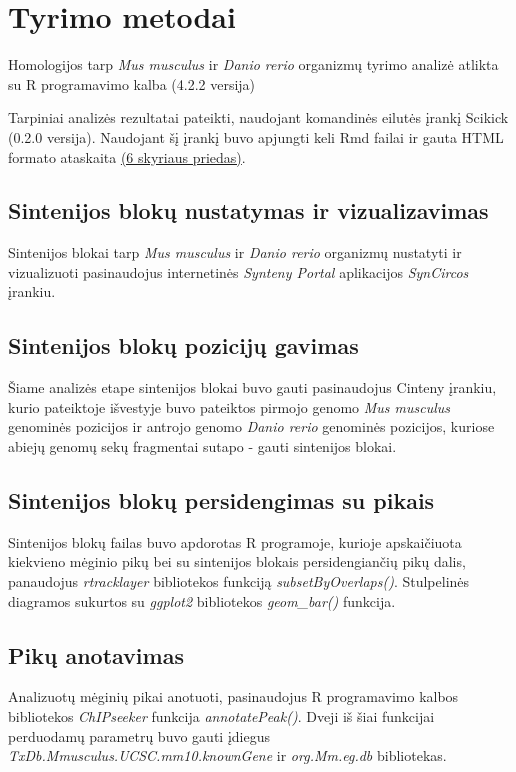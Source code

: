 \documentclass[12pt]{article}
\begin{document}
\newpage


\section{Tyrimo metodai}
Homologijos tarp \emph{Mus musculus} ir \emph{Danio rerio} organizmų
tyrimo analizė atlikta su R programavimo kalba\cite{R} (4.2.2 versija)

Tarpiniai analizės rezultatai pateikti, naudojant komandinės eilutės įrankį
Scikick\cite{SCIK} (0.2.0 versija). Naudojant šį įrankį buvo apjungti keli Rmd
failai ir gauta HTML formato ataskaita \hyperref[Priedas]{(6 skyriaus priedas)}.

\subsection{Sintenijos blokų nustatymas ir vizualizavimas}
Sintenijos blokai tarp \emph{Mus musculus} ir \emph{Danio rerio} organizmų
nustatyti ir vizualizuoti pasinaudojus internetinės
\emph{Synteny Portal}\cite{SYN_PORT} aplikacijos \emph{SynCircos} įrankiu.

\subsection{Sintenijos blokų pozicijų gavimas}
Šiame analizės etape sintenijos blokai buvo gauti pasinaudojus Cinteny
įrankiu, kurio pateiktoje išvestyje buvo pateiktos pirmojo genomo
\emph{Mus musculus} genominės pozicijos ir antrojo genomo \emph{Danio rerio}
genominės pozicijos, kuriose abiejų genomų sekų fragmentai sutapo - gauti
sintenijos blokai.

\subsection{Sintenijos blokų persidengimas su pikais}
Sintenijos blokų failas buvo apdorotas R programoje, kurioje apskaičiuota
kiekvieno mėginio pikų bei su sintenijos blokais persidengiančių pikų dalis,
panaudojus \emph{rtracklayer}\cite{R_TRACK} bibliotekos funkciją
\emph{subsetByOverlaps()}. Stulpelinės diagramos sukurtos su
\emph{ggplot2}\cite{R_GGPLOT} bibliotekos \emph{geom\_bar()} funkcija.

\subsection{Pikų anotavimas}
Analizuotų mėginių pikai anotuoti, pasinaudojus R programavimo kalbos
bibliotekos \emph{ChIPseeker}\cite{CHIP1, CHIP2} funkcija
\emph{annotatePeak()}. Dveji iš šiai funkcijai perduodamų parametrų buvo gauti
įdiegus \emph{TxDb.Mmusculus.UCSC.mm10.knownGene}\cite{KNOWN_GENE}
ir \emph{org.Mm.eg.db}\cite{MM_ANNOT} bibliotekas.
\end{document}

